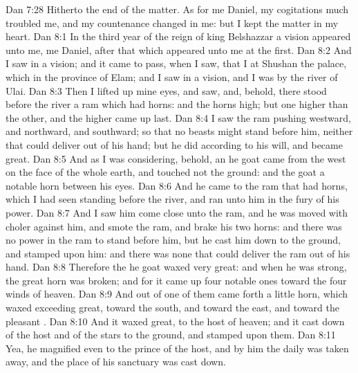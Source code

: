 \vs Dan 7:28 Hitherto  the end of the matter. As for me Daniel, my cogitations much troubled me, and my countenance changed in me: but I kept the matter in my heart.
\vs Dan 8:1 In the third year of the reign of king Belshazzar a vision appeared unto me,  me Daniel, after that which appeared unto me at the first.
\vs Dan 8:2 And I saw in a vision; and it came to pass, when I saw, that I  at Shushan  the palace, which  in the province of Elam; and I saw in a vision, and I was by the river of Ulai.
\vs Dan 8:3 Then I lifted up mine eyes, and saw, and, behold, there stood before the river a ram which had  horns: and the  horns  high; but one  higher than the other, and the higher came up last.
\vs Dan 8:4 I saw the ram pushing westward, and northward, and southward; so that no beasts might stand before him, neither  that could deliver out of his hand; but he did according to his will, and became great.
\vs Dan 8:5 And as I was considering, behold, an he goat came from the west on the face of the whole earth, and touched not the ground: and the goat  a notable horn between his eyes.
\vs Dan 8:6 And he came to the ram that had  horns, which I had seen standing before the river, and ran unto him in the fury of his power.
\vs Dan 8:7 And I saw him come close unto the ram, and he was moved with choler against him, and smote the ram, and brake his two horns: and there was no power in the ram to stand before him, but he cast him down to the ground, and stamped upon him: and there was none that could deliver the ram out of his hand.
\vs Dan 8:8 Therefore the he goat waxed very great: and when he was strong, the great horn was broken; and for it came up four notable ones toward the four winds of heaven.
\vs Dan 8:9 And out of one of them came forth a little horn, which waxed exceeding great, toward the south, and toward the east, and toward the pleasant .
\vs Dan 8:10 And it waxed great,  to the host of heaven; and it cast down  of the host and of the stars to the ground, and stamped upon them.
\vs Dan 8:11 Yea, he magnified  even to the prince of the host, and by him the daily  was taken away, and the place of his sanctuary was cast down.
